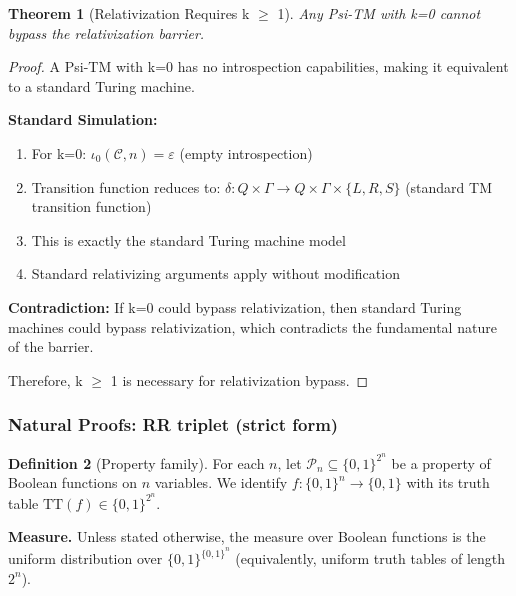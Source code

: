 \documentclass[11pt]{article}
\newtheorem{theorem}{Theorem}[section]
\theoremstyle{plain}
\theoremstyle{definition}
\newtheorem{definition}[theorem]{Definition}
\newcommand{\bits}{\{0,1\}}
\begin{document}
\begin{theorem}[Relativization Requires k \ensuremath{\geq} 1]
\label{thm:relativization-k0}
Any Psi-TM with k=0 cannot bypass the relativization barrier.
\end{theorem}

\begin{proof}
A Psi-TM with k=0 has no introspection capabilities, making it equivalent to a standard Turing machine.

\textbf{Standard Simulation:}
\begin{enumerate}
\item For k=0: $\iota_0(\mathcal{C}, n) = \varepsilon$ (empty introspection)
\item Transition function reduces to: $\delta: Q \times \Gamma \to Q \times \Gamma \times \{L, R, S\}$ (standard TM transition function)
\item This is exactly the standard Turing machine model
\item Standard relativizing arguments apply without modification
\end{enumerate}

\textbf{Contradiction:} If k=0 could bypass relativization, then standard Turing machines could bypass relativization, which contradicts the fundamental nature of the barrier.

Therefore, k $\geq$ 1 is necessary for relativization bypass.
\end{proof}

\subsubsection{Natural Proofs: RR triplet (strict form)}
\label{sec:natural-rr}

\begin{definition}[Property family]
For each $n$, let $\mathcal{P}_n\subseteq \{0,1\}^{2^n}$ be a property of Boolean functions on $n$ variables. We identify $f:\bits^n\to\bits$ with its truth table $\mathrm{TT}(f)\in\bits^{2^n}$.
\end{definition}

\noindent\textbf{Measure.} Unless stated otherwise, the measure over Boolean functions is the uniform distribution over $\{0,1\}^{\{0,1\}^n}$ (equivalently, uniform truth tables of length $2^n$).
\end{document}
